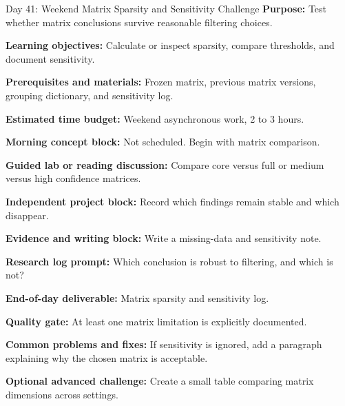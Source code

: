\begin{dailybox}{Day 41: Weekend Matrix Sparsity and Sensitivity Challenge}
\textbf{Purpose:} Test whether matrix conclusions survive reasonable filtering choices.

\textbf{Learning objectives:} Calculate or inspect sparsity, compare thresholds, and document sensitivity.

\textbf{Prerequisites and materials:} Frozen matrix, previous matrix versions, grouping dictionary, and sensitivity log.

\textbf{Estimated time budget:} Weekend asynchronous work, 2 to 3 hours.

\textbf{Morning concept block:} Not scheduled. Begin with matrix comparison.

\textbf{Guided lab or reading discussion:} Compare core versus full or medium versus high confidence matrices.

\textbf{Independent project block:} Record which findings remain stable and which disappear.

\textbf{Evidence and writing block:} Write a missing-data and sensitivity note.

\textbf{Research log prompt:} Which conclusion is robust to filtering, and which is not?

\textbf{End-of-day deliverable:} Matrix sparsity and sensitivity log.

\textbf{Quality gate:} At least one matrix limitation is explicitly documented.

\textbf{Common problems and fixes:} If sensitivity is ignored, add a paragraph explaining why the chosen matrix is acceptable.

\textbf{Optional advanced challenge:} Create a small table comparing matrix dimensions across settings.
\end{dailybox}

